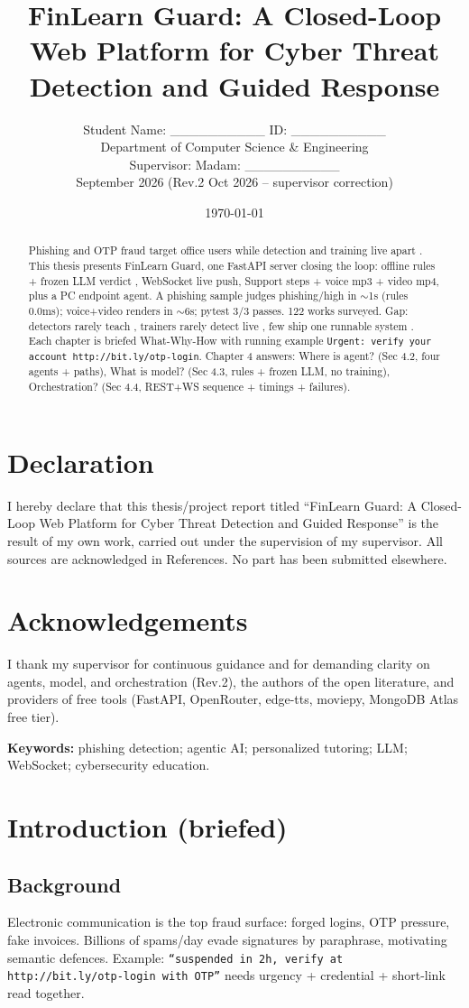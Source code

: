 \documentclass[11pt,a4paper]{article}
\title{FinLearn Guard: A Closed-Loop Web Platform for Cyber Threat Detection and Guided Response}
\author{Student Name: \_\_\_\_\_\_\_\_\_\_ \quad ID: \_\_\_\_\_\_\_\_\_\_ \\ Department of Computer Science \& Engineering \\ Supervisor: Madam: \_\_\_\_\_\_\_\_\_\_ \\ September 2026 (Rev.2 Oct 2026 -- supervisor correction)}
\date{\today}
\begin{document}
\maketitle
\section*{Declaration}
I hereby declare that this thesis/project report titled ``FinLearn Guard: A Closed-Loop Web Platform for Cyber Threat Detection and Guided Response'' is the result of my own work, carried out under the supervision of my supervisor. All sources are acknowledged in References. No part has been submitted elsewhere.
\section*{Acknowledgements}
I thank my supervisor for continuous guidance and for demanding clarity on agents, model, and orchestration (Rev.2), the authors of the open literature, and providers of free tools (FastAPI, OpenRouter, edge-tts, moviepy, MongoDB Atlas free tier).
\begin{abstract}
Phishing and OTP fraud target office users while detection and training live apart \cite{Heiding24,Koide24,Desolda24,Nair25}.
This thesis presents FinLearn Guard, one FastAPI server closing the loop: offline rules + frozen LLM verdict \cite{Koide24,Desolda24}, WebSocket live push, Support steps + voice mp3 + video mp4, plus a PC endpoint agent.
A phishing sample judges phishing/high in $\sim$1s (rules 0.0ms); voice+video renders in $\sim$6s; pytest 3/3 passes.
122 works surveyed. Gap: detectors rarely teach \cite{Koide24,Desolda24,SAGE26}, trainers rarely detect live \cite{SENSAI25,SYNAPSE26}, few ship one runnable system \cite{FraudR125,FinAgentBench25}.
Each chapter is briefed What-Why-How with running example \texttt{Urgent: verify your account http://bit.ly/otp-login}.
Chapter 4 answers: Where is agent? (Sec 4.2, four agents + paths), What is model? (Sec 4.3, rules + frozen LLM, no training), Orchestration? (Sec 4.4, REST+WS sequence + timings + failures).
\end{abstract}
\noindent\textbf{Keywords:} phishing detection; agentic AI; personalized tutoring; LLM; WebSocket; cybersecurity education.
\tableofcontents
\listoffigures
\listoftables
\section{Introduction (briefed)}
\subsection{Background}
Electronic communication is the top fraud surface: forged logins, OTP pressure, fake invoices. Billions of spams/day \cite{Nair25} evade signatures by paraphrase, motivating semantic defences. Example: \texttt{``suspended in 2h, verify at http://bit.ly/otp-login with OTP''} needs urgency + credential + short-link read together.
\end{document}
